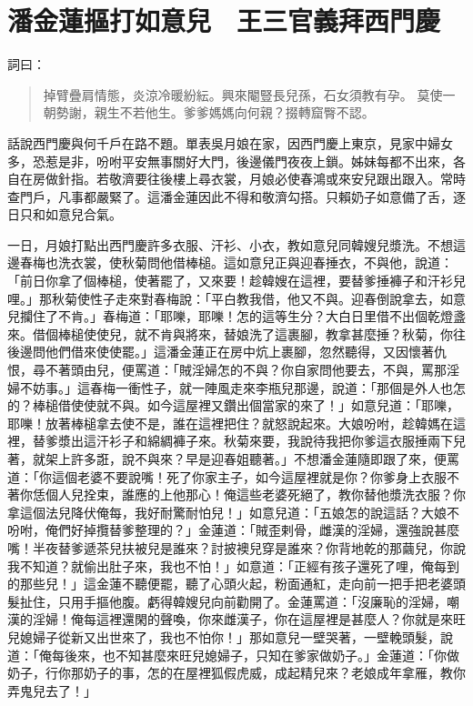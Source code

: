 
\chapter{潘金蓮摳打如意兒　王三官義拜西門慶}

詞曰：
\begin{quote}
掉臂疊肩情態，炎涼冷暖紛紜。興來閹豎長兒孫，石女須教有孕。
莫使一朝勢謝，親生不若他生。爹爹媽媽向何親？掇轉窟臀不認。
\end{quote}

話說西門慶與何千戶在路不題。單表吳月娘在家，因西門慶上東京，見家中婦女多，恐惹是非，吩咐平安無事關好大門，後邊儀門夜夜上鎖。姊妹每都不出來，各自在房做針指。若敬濟要往後樓上尋衣裳，月娘必使春鴻或來安兒跟出跟入。常時查門戶，凡事都嚴緊了。這潘金蓮因此不得和敬濟勾搭。只賴奶子如意備了舌，逐日只和如意兒合氣。

一日，月娘打點出西門慶許多衣服、汗衫、小衣，教如意兒同韓嫂兒漿洗。不想這邊春梅也洗衣裳，使秋菊問他借棒槌。這如意兒正與迎春捶衣，不與他，說道：「前日你拿了個棒槌，使著罷了，又來要！趁韓嫂在這裡，要替爹捶褲子和汗衫兒哩。」那秋菊使性子走來對春梅說：「平白教我借，他又不與。迎春倒說拿去，如意兒攔住了不肯。」春梅道：「耶嚛，耶嚛！怎的這等生分？大白日里借不出個乾燈盞來。借個棒槌使使兒，就不肯與將來，替娘洗了這裹腳，教拿甚麼捶？秋菊，你往後邊問他們借來使使罷。」這潘金蓮正在房中炕上裹腳，忽然聽得，又因懷著仇恨，尋不著頭由兒，便罵道：「賊淫婦怎的不與？你自家問他要去，不與，罵那淫婦不妨事。」這春梅一衝性子，就一陣風走來李瓶兒那邊，說道：「那個是外人也怎的？棒槌借使使就不與。如今這屋裡又鑽出個當家的來了！」如意兒道：「耶嚛，耶嚛！放著棒槌拿去使不是，誰在這裡把住？就怒說起來。大娘吩咐，趁韓媽在這裡，替爹漿出這汗衫子和綿綢褲子來。秋菊來要，我說待我把你爹這衣服捶兩下兒著，就架上許多誑，說不與來？早是迎春姐聽著。」不想潘金蓮隨即跟了來，便罵道：「你這個老婆不要說嘴！死了你家主子，如今這屋裡就是你？你爹身上衣服不著你恁個人兒拴束，誰應的上他那心！俺這些老婆死絕了，教你替他漿洗衣服？你拿這個法兒降伏俺每，我好耐驚耐怕兒！」如意兒道：「五娘怎的說這話？大娘不吩咐，俺們好掉攬替爹整理的？」金蓮道：「賊歪剌骨，雌漢的淫婦，還強說甚麼嘴！半夜替爹遞茶兒扶被兒是誰來？討披襖兒穿是誰來？你背地乾的那繭兒，你說我不知道？就偷出肚子來，我也不怕！」如意道：「正經有孩子還死了哩，俺每到的那些兒！」這金蓮不聽便罷，聽了心頭火起，粉面通紅，走向前一把手把老婆頭髮扯住，只用手摳他腹。虧得韓嫂兒向前勸開了。金蓮罵道：「沒廉恥的淫婦，嘲漢的淫婦！俺每這裡還閑的聲喚，你來雌漢子，你在這屋裡是甚麼人？你就是來旺兒媳婦子從新又出世來了，我也不怕你！」那如意兒一壁哭著，一壁輓頭髮，說道：「俺每後來，也不知甚麼來旺兒媳婦子，只知在爹家做奶子。」金蓮道：「你做奶子，行你那奶子的事，怎的在屋裡狐假虎威，成起精兒來？老娘成年拿雁，教你弄鬼兒去了！」

